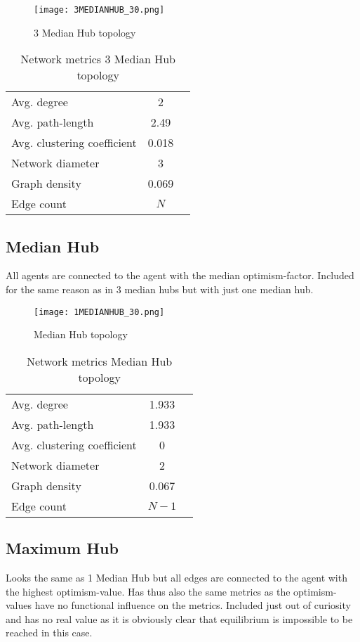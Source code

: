 \documentclass[Bachelorarbeit.tex]{subfiles}
\begin{document}
\begin{figure}[H]
	\centering
  \texttt{[image: 3MEDIANHUB\_30.png]}
	\caption{3 Median Hub topology}
	\label{fig:topology_3MEDIANHUB_30}
\end{figure}

\begin{table}[h]
	\centering
	\caption{Network metrics 3 Median Hub topology}
	\begin{tabular} { l c r }
		\hline
		Avg. degree & 2 \\
		Avg. path-length & 2.49 \\
		Avg. clustering coefficient & 0.018 \\
		Network diameter & 3 \\
		Graph density & 0.069 \\
		Edge count & $N$ \\
		\hline
	\end{tabular}
\end{table}

\subsection{Median Hub}
All agents are connected to the agent with the median optimism-factor.
\medskip
Included for the same reason as in 3 median hubs but with just one median hub.

\begin{figure}[H]
	\centering
  \texttt{[image: 1MEDIANHUB\_30.png]}
	\caption{Median Hub topology}
	\label{fig:topology_1MEDIANHUB_30}
\end{figure}

\begin{table}[h]
	\centering
	\caption{Network metrics Median Hub topology}
	\begin{tabular} { l c r }
		\hline
		Avg. degree & 1.933 \\
		Avg. path-length & 1.933 \\
		Avg. clustering coefficient & 0 \\
		Network diameter & 2 \\
		Graph density & 0.067 \\
		Edge count & $N-1$ \\
		\hline
	\end{tabular}
\end{table}

\subsection{Maximum Hub}
Looks the same as 1 Median Hub but all edges are connected to the agent with the highest optimism-value. Has thus also the same metrics as the optimism-values have no functional influence on the metrics.
\medskip
Included just out of curiosity and has no real value as it is obviously clear that equilibrium is impossible to be reached in this case.
\end{document}
